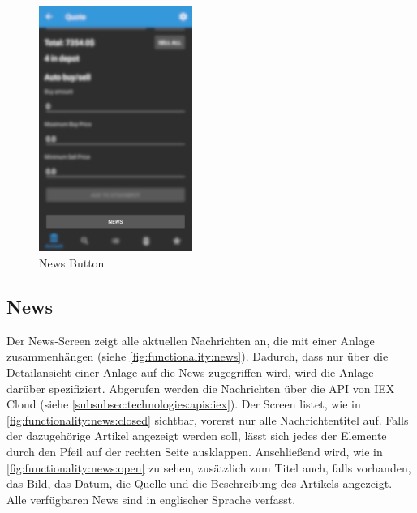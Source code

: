 \documentclass[a4paper]{article}
\begin{document}
\begin{figure}[H]
    \centering
    \includegraphics[height=8cm,keepaspectratio]{./images/news/news_button.png}
    \caption{News Button}
    \label{fig:functionality:news:button}
\end{figure}


\subsection{News}
\label{subsec:functionality:news}
Der News-Screen zeigt alle aktuellen Nachrichten an, die mit einer Anlage zusammenhängen (siehe \autoref{fig:functionality:news}). Dadurch, dass nur über die Detailansicht einer Anlage auf die News zugegriffen wird, wird die Anlage darüber spezifiziert. Abgerufen werden die Nachrichten über die API von IEX Cloud (siehe \autoref{subsubsec:technologies:apis:iex}). Der Screen listet, wie in \autoref{fig:functionality:news:closed} sichtbar, vorerst nur alle Nachrichtentitel auf. Falls der dazugehörige Artikel angezeigt werden soll, lässt sich jedes der Elemente durch den Pfeil auf der rechten Seite ausklappen. Anschließend wird, wie in \autoref{fig:functionality:news:open} zu sehen, zusätzlich zum Titel auch, falls vorhanden, das Bild, das Datum, die Quelle und die Beschreibung des Artikels angezeigt. Alle verfügbaren News sind in englischer Sprache verfasst.
\end{document}
